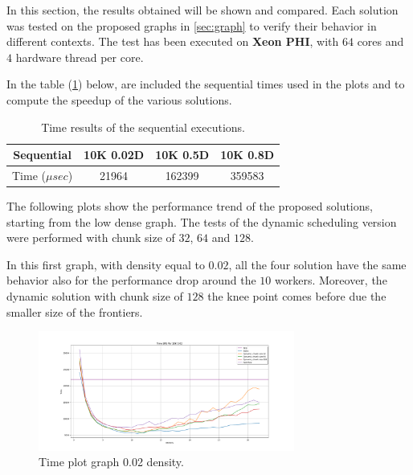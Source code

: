 In this section, the results obtained will be shown and compared. Each solution was tested on the proposed graphs in \ref{sec:graph} to verify their behavior in different contexts. 
The test has been executed on \textbf{Xeon PHI}, with $64$ cores and $4$ hardware thread per core. 

In the table (\ref{table:seq_times}) below, are included the sequential times used in the plots and to compute the speedup of the various solutions.
\begin{table}[htb!]
\centering
\begin{tabular}{|c|c|c|c|}
\hline
Sequential & 10K 0.02D & 10K 0.5D & 10K 0.8D \\ \hline
Time ($\mu sec$)          & 21964     & 162399   & 359583   \\ \hline
\end{tabular}
\caption{Time results of the sequential executions.}
\label{table:seq_times}
\end{table}
\FloatBarrier

The following plots show the performance trend of the proposed solutions, starting from the low dense graph. The tests of the dynamic scheduling version were performed with chunk size of $32$, $64$ and $128$. 

In this first graph, with density equal to $0.02$, all the four solution have the same behavior also for the performance drop around the $10$ workers. Moreover, the dynamic solution with chunk size of $128$ the knee point comes before due the smaller size of the frontiers.
\begin{figure}[htb!]
    \centering
    \includegraphics[width=0.75\textwidth]{Figures/plot_map_time_vs10K002.png}
    \caption{Time plot graph 0.02 density.}
    \label{fig:plot_time_10k_002}
\end{figure}
\FloatBarrier


